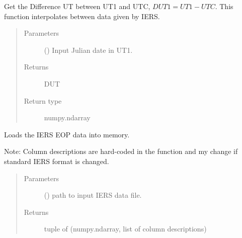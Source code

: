 \documentclass[letterpaper,10pt,english]{sphinxmanual}
\begin{document}
\begin{fulllineitems}
\label{\detokenize{modules/TLE_tools:TLE_tools.get_DUT}}
Get the Difference UT between UT1 and UTC, \(DUT1 = UT1 - UTC\). This function interpolates between data given by IERS.
\begin{quote}\begin{description}
\item[{Parameters}] \leavevmode
{} () \textendash{} Input Julian date in UT1.

\item[{Returns}] \leavevmode
DUT

\item[{Return type}] \leavevmode
numpy.ndarray

\end{description}\end{quote}

\end{fulllineitems}


\begin{fulllineitems}
\label{\detokenize{modules/TLE_tools:TLE_tools.get_IERS_EOP}}
Loads the IERS EOP data into memory.

Note: Column descriptions are hard-coded in the function and my change if standard IERS format is changed.
\begin{quote}\begin{description}
\item[{Parameters}] \leavevmode
{} () \textendash{} path to input IERS data file.

\item[{Returns}] \leavevmode
tuple of (numpy.ndarray, list of column descriptions)

\end{description}\end{quote}

\end{fulllineitems}
\end{document}
